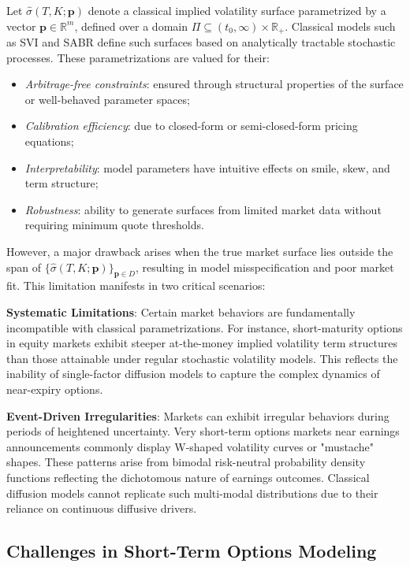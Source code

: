 Let $\hat{\sigma}(T, K; \mathbf{p})$ denote a classical implied volatility surface parametrized by a vector $\mathbf{p} \in \mathbb{R}^m$, defined over a domain $\Pi \subseteq (t_0, \infty) \times \mathbb{R}_+$.
Classical models such as SVI and SABR define such surfaces based on analytically tractable stochastic processes.
These parametrizations are valued for their:

\begin{itemize}
    \item \textit{Arbitrage-free constraints}: ensured through structural properties of the surface or well-behaved parameter spaces;
    \item \textit{Calibration efficiency}: due to closed-form or semi-closed-form pricing equations;
    \item \textit{Interpretability}: model parameters have intuitive effects on smile, skew, and term structure;
    \item \textit{Robustness}: ability to generate surfaces from limited market data without requiring minimum quote thresholds.
\end{itemize}

However, a major drawback arises when the true market surface lies outside the span of $\{\hat{\sigma}(T,K; \mathbf{p})\}_{\mathbf{p} \in D}$, resulting in model misspecification and poor market fit.
This limitation manifests in two critical scenarios:

\textbf{Systematic Limitations}: Certain market behaviors are fundamentally incompatible with classical parametrizations. For instance, short-maturity options in equity markets exhibit steeper at-the-money implied volatility term structures than those attainable under regular stochastic volatility models. This reflects the inability of single-factor diffusion models to capture the complex dynamics of near-expiry options.

\textbf{Event-Driven Irregularities}: Markets can exhibit irregular behaviors during periods of heightened uncertainty. Very short-term options markets near earnings announcements commonly display W-shaped volatility curves or "mustache" shapes. These patterns arise from bimodal risk-neutral probability density functions reflecting the dichotomous nature of earnings outcomes. Classical diffusion models cannot replicate such multi-modal distributions due to their reliance on continuous diffusive drivers.

\subsection{Challenges in Short-Term Options Modeling}

